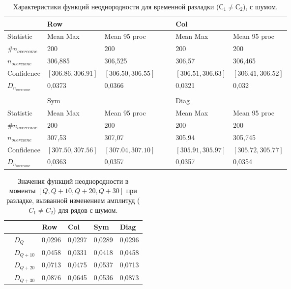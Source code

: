 \documentclass[specialist, substylefile = spbu.rtx,
			   subf, href, 12pt]{disser}
\begin{document}
\newpage
\begin{table}[!hhh]
	\center
	\small
	\caption{Характеристики функций неоднородности для временной разладки ($С_1 \neq С_2$), с шумом.}
	\begin{tabular}{l|lll|lll}
		 				   & Row		  	  & 			 &&  & 	Col	      & 			      \\
		 				   \hline
		 Statistic        & Mean Max 	  & Mean 95 proc && 	& Mean Max     & Mean 95 proc     \\
		 $\#n_{overcome}$ & 200 	  	  & 200 		 &&     & 200 	      & 200 			  \\
		 $n_{overcome}$   & 306,885   	  & 306,525      &&     & 306,57       & 306,465 		  \\
		 Confidence       & $[306.86, 306.91]$& $[306.50, 306.55]$&&     & $[306.51, 306.63]$ & $[306.41, 306.52]$     \\
		$D_{n_{overcome}}$& 0,0373		  &	0,0366		 &&     & 0,0321  &   0,032          \\
		&&&&&& \\
		 				   & Sym		  	  & 			 && & 	Diag	      & 			      \\
		\hline
		 Statistic        & Mean Max 	  & Mean 95 proc && 	& Mean Max     & Mean 95 proc     \\
		 $\#n_{overcome}$ & 200 	  	  & 200 		 &&     & 200 	      & 200 			  \\
		 $n_{overcome}$   & 307,53   	  & 307,07      &&     & 305,94      & 305,745 		  \\
		 Confidence       & $[307.50, 307.56]$ & $[307.04, 307.10]$ &&     & $[305.91, 305.97]$ & $[305.72, 305.77]$     \\
		$D_{n_{overcome}}$& 0,0363		  &	0,0357		 &&     & 0,0357		 &0,0354          \\
	\end{tabular}
	\label{tab:TemporaryHeterogeneityNoisedAmplitude}
\end{table}

\begin{table}[!hhh]
		\center
		\caption{Значения функций неоднородности в моменты $[Q, Q+10, Q+20, Q+30]$ при разладке, вызванной изменением амплитуд ($ C_1 \neq C_2 $) для рядов с шумом.}
	\begin{tabular}{ll|llll}
		&              & Row 	  & Col 	& Sym    & Diag  \\
		\hline
		& $D_Q$        & 0,0296	  & 0,0297 	& 0,0289 & 0,0296		\\
		& $D_{Q+10}$   & 0,0458   & 0,0331  & 0,0418 & 0,0458	\\
		& $D_{Q+20}$   & 0,0713   & 0,0475  & 0,0537 & 0,0713	\\
		& $D_{Q+30}$   & 0,0876	  &	0,0645	& 0,0536 & 0,0873	
	\end{tabular}
	\label{tab:TemporaryHeterogeneityNoisedAmplitudeValues}
\end{table}
\end{document}
